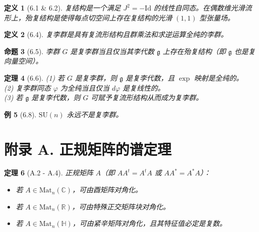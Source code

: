 \documentclass[12pt, a4paper]{ctexart}
\newtheorem{theorem}{定理}[section]
\newtheorem{proposition}[theorem]{命题}
\newtheorem{definition}[theorem]{定义}
\newtheorem{example}[theorem]{例}
\begin{document}
\begin{definition}[6.1 \& 6.2]
复结构是一个满足 $J^2 = -\mathrm{Id}$ 的线性自同态。在偶数维光滑流形上，殆复结构是使得每点切空间上存在复结构的光滑 $(1,1)$ 型张量场。
\end{definition}

\begin{definition}[6.4]
复李群是具有复流形结构且群乘法和求逆运算全纯的李群。
\end{definition}

\begin{proposition}[6.5]
李群 $G$ 是复李群当且仅当其李代数 $\mathfrak{g}$ 上存在殆复结构（即 $\mathfrak{g}$ 也是复向量空间）。
\end{proposition}

\begin{theorem}[6.6]
(1) 若 $G$ 是复李群，则 $\mathfrak{g}$ 是复李代数，且 $\exp$ 映射是全纯的。\\
(2) 复李群同态 $\varphi$ 为全纯当且仅当 $d\varphi$ 是复线性的。\\
(3) 若 $\mathfrak{g}$ 是复李代数，则 $G$ 可赋予复流形结构从而成为复李群。
\end{theorem}

\begin{example}[6.8]
$\mathrm{SU}(n)$ 永远不是复李群。
\end{example}

\section*{附录 A. 正规矩阵的谱定理}

\begin{theorem}[A.2 - A.4]
正规矩阵 $A$（即 $A A^t = A^t A$ 或 $A A^* = A^* A$）：
\begin{itemize}
    \item 若 $A \in \mathrm{Mat}_n(\mathbb{C})$，可由酉矩阵对角化。
    \item 若 $A \in \mathrm{Mat}_n(\mathbb{R})$，可由特殊正交矩阵块对角化。
    \item 若 $A \in \mathrm{Mat}_n(\mathbb{H})$，可由紧辛矩阵对角化，且其特征值必定是复数。
\end{itemize}
\end{theorem}
\end{document}
